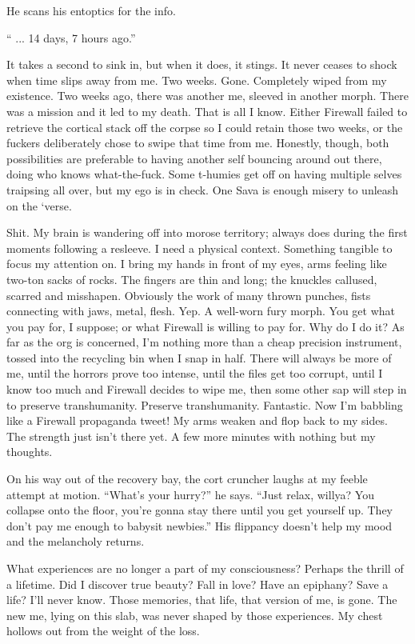 He scans his entoptics for the info.

`` ... 14 days, 7 hours ago.''

It takes a second to sink in, but when it does, it stings. It never
ceases to shock when time slips away from me. Two
weeks. Gone. Completely wiped from my existence. Two weeks ago, there
was another me, sleeved in another morph. There was a mission and it
led to my death. That is all I know. Either Firewall failed to
retrieve the cortical stack off the corpse so I could retain those two
weeks, or the fuckers deliberately chose to swipe that time from
me. Honestly, though, both possibilities are preferable to having
another self bouncing around out there, doing who knows
what-the-fuck. Some t-humies get off on having multiple selves
traipsing all over, but my ego is in check. One Sava is enough misery
to unleash on the ‘verse.

Shit. My brain is wandering off into morose territory; always does
during the first moments following a resleeve. I need a physical
context. Something tangible to focus my attention on. I bring my hands
in front of my eyes, arms feeling like two-ton sacks of rocks. The
fingers are thin and long; the knuckles callused, scarred and
misshapen. Obviously the work of many thrown punches, fists connecting
with jaws, metal, flesh. Yep. A well-worn fury morph. You get what you
pay for, I suppose; or what Firewall is willing to pay for. Why do I
do it? As far as the org is concerned, I'm nothing more than a cheap
precision instrument, tossed into the recycling bin when I snap in
half. There will always be more of me, until the horrors prove too
intense, until the files get too corrupt, until I know too much and
Firewall decides to wipe me, then some other sap will step in to
preserve transhumanity. Preserve transhumanity. Fantastic. Now I'm
babbling like a Firewall propaganda tweet! My arms weaken and flop
back to my sides. The strength just isn't there yet. A few more
minutes with nothing but my thoughts.

On his way out of the recovery bay, the cort cruncher laughs at my
feeble attempt at motion. ``What's your hurry?'' he says. ``Just relax,
willya? You collapse onto the floor, you're gonna stay there until you
get yourself up. They don't pay me enough to babysit newbies.'' His
flippancy doesn't help my mood and the melancholy returns.

What experiences are no longer a part of my consciousness? Perhaps the
thrill of a lifetime. Did I discover true beauty? Fall in love? Have
an epiphany? Save a life? I'll never know. Those memories, that life,
that version of me, is gone. The new me, lying on this slab, was never
shaped by those experiences. My chest hollows out from the weight of
the loss.

